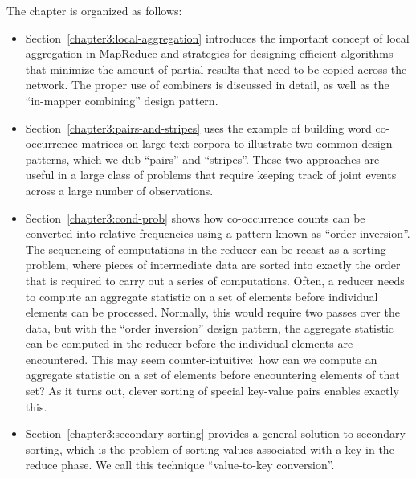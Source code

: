 The chapter is organized as follows:

\begin{itemize}

\item Section~\ref{chapter3:local-aggregation} introduces the
  important concept of local aggregation in MapReduce and strategies
  for designing efficient algorithms that minimize the amount of
  partial results that need to be copied across the network.  The
  proper use of combiners is discussed in detail, as well as the
  ``in-mapper combining'' design pattern.

\item Section~\ref{chapter3:pairs-and-stripes} uses the example of
  building word co-occurrence matrices on large text corpora to
  illustrate two common design patterns, which we dub ``pairs'' and
  ``stripes''.  These two approaches are useful in a large class of
  problems that require keeping track of joint events across a large
  number of observations.

\item Section~\ref{chapter3:cond-prob} shows how co-occurrence counts
  can be converted into relative frequencies using a pattern known as
  ``order inversion''.  The sequencing of computations in the reducer
  can be recast as a sorting problem, where pieces of intermediate
  data are sorted into exactly the order that is required to carry out
  a series of computations.  Often, a reducer needs to compute an
  aggregate statistic on a set of elements before individual elements
  can be processed.  Normally, this would require two passes over the
  data, but with the ``order inversion'' design pattern, the aggregate
  statistic can be computed in the reducer before the individual
  elements are encountered.  This may seem counter-intuitive:\ how can
  we compute an aggregate statistic on a set of elements before
  encountering elements of that set?  As it turns out, clever sorting
  of special key-value pairs enables exactly this.

\item Section~\ref{chapter3:secondary-sorting} provides a general
  solution to secondary sorting, which is the problem of sorting
  values associated with a key in the reduce phase.  We call this
  technique ``value-to-key conversion''.


\end{itemize}

